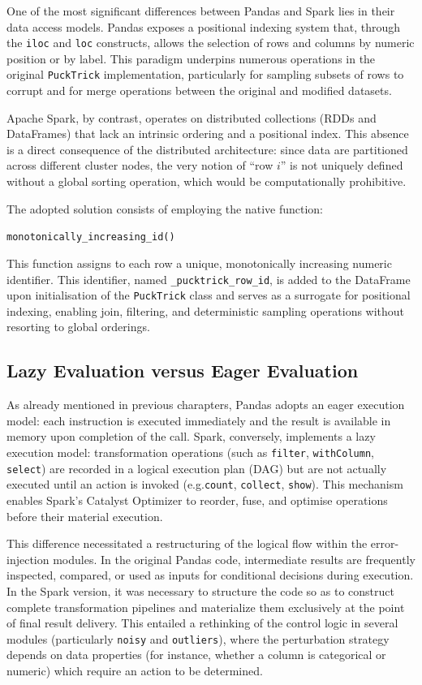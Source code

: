 \documentclass[../main.tex]{subfiles}
\begin{document}
One of the most significant differences between Pandas and Spark lies in their data 
access models. Pandas exposes a positional indexing system that, through the \texttt{iloc} 
and \texttt{loc} constructs, allows the selection of rows and columns by numeric position 
or by label. This paradigm underpins numerous operations in the original \texttt{PuckTrick} 
implementation, particularly for sampling subsets of rows to corrupt and for merge 
operations between the original and modified datasets.

Apache Spark, by contrast, operates on distributed collections (RDDs and DataFrames) that 
lack an intrinsic ordering and a positional index. This absence is a direct consequence 
of the distributed architecture: since data are partitioned across different cluster 
nodes, the very notion of ``row $i$'' is not uniquely defined without a global sorting 
operation, which would be computationally prohibitive.

The adopted solution consists of employing the native function:
\begin{center}
    \texttt{monotonically\_increasing\_id()}
\end{center}
This function assigns to each row a unique, monotonically increasing numeric identifier. 
This identifier, named \texttt{\_pucktrick\_row\_id}, is added to the DataFrame upon 
initialisation of the \texttt{PuckTrick} class and serves as a surrogate for positional 
indexing, enabling join, filtering, and deterministic sampling operations without 
resorting to global orderings.

\subsection{Lazy Evaluation versus Eager Evaluation}
\label{sec:lazy}

As already mentioned in previous charapters, Pandas adopts an eager execution model: each instruction is executed immediately and the result is available in memory upon completion of the call. Spark, conversely, implements a lazy execution model: transformation operations (such as \texttt{filter}, 
\texttt{withColumn}, \texttt{select}) are recorded in a logical execution plan (DAG) but are not actually executed until an action is invoked (e.g.\texttt{count}, \texttt{collect}, \texttt{show}). This mechanism enables Spark's Catalyst Optimizer to reorder, fuse, and optimise operations before their material execution.

This difference necessitated a restructuring of the logical flow within the error-injection modules. In the original Pandas code, intermediate results are frequently inspected, compared, or used as inputs for conditional decisions during execution. In the Spark version, it was necessary to structure the code so as to construct complete transformation pipelines and materialize them exclusively at the point of final result delivery. This entailed a rethinking of the control logic in several modules (particularly \texttt{noisy} and \texttt{outliers}), where the perturbation strategy depends on data properties (for instance, whether a column is categorical or numeric) which require an action to be determined.
\end{document}
